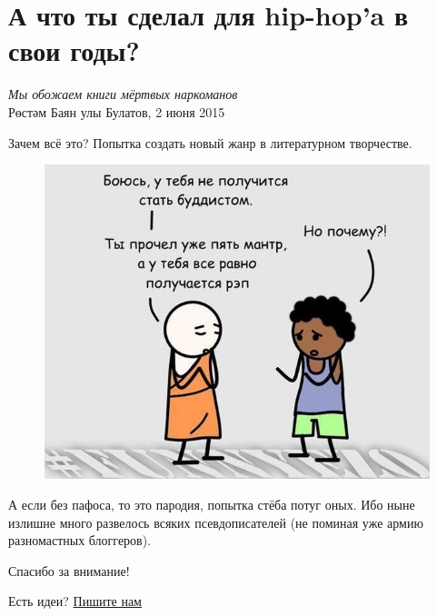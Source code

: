 \documentclass{ideas}
\begin{document}
\section*{А что ты сделал для hip-hop'a в свои годы?}\label{section:one}
\begin{displayquote}
\begin{flushright}
    \emph{Мы обожаем книги мёртвых наркоманов}\\
    Рөстәм Баян улы Булатов, 2 июня 2015
\end{flushright}
\end{displayquote}
Зачем всё это? Попытка создать новый жанр в литературном творчестве.
\begin{figure}[ht!]
    \centering
    \includegraphics[width=\textwidth]{hip-zen}
\end{figure}
 А если без пафоса, то это пародия, попытка стёба потуг оных. Ибо ныне излишне много развелось всяких псевдописателей (не поминая уже армию разномастных блоггеров).






\vspace*{\fill}
\begin{center}
    \large 
    Спасибо за внимание!

    \vspace{2em}
    Есть идеи?
    \href{mailto:anto-kha0@rambler.ru}{Пишите нам}
\end{center}
\vfill
\thispagestyle{empty}
\end{document}

